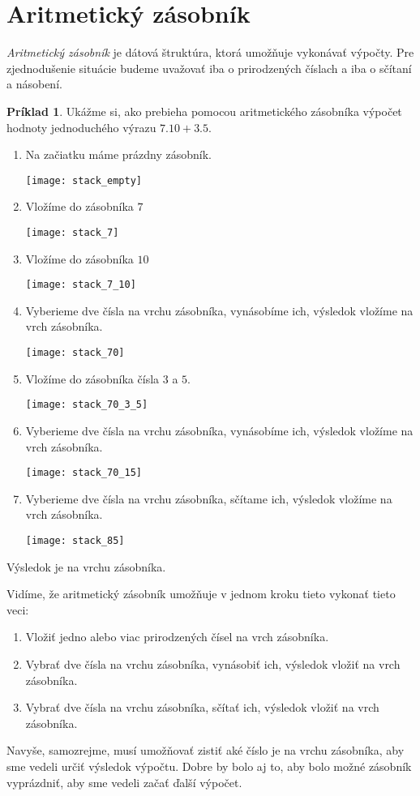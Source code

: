 \documentclass[11pt]{article}
\theoremstyle{definition}
\newtheorem{example}[theorem]{Príklad}
\begin{document}
\section{Aritmetický zásobník}
{\em Aritmetický zásobník} je dátová štruktúra, ktorá umožňuje vykonávať výpočty. Pre zjednodušenie
situácie budeme uvažovať iba o prirodzených číslach a iba o sčítaní a násobení.
\begin{example}
Ukážme si, ako prebieha pomocou aritmetického zásobníka výpočet hodnoty 
jednoduchého výrazu $7.10+3.5$.
\begin{enumerate}
\item Na začiatku máme prázdny zásobník.
\begin{center}
\texttt{[image: stack\_empty]}
\end{center}
\item Vložíme do zásobníka $7$
\begin{center}
\texttt{[image: stack\_7]}
\end{center}
\item Vložíme do zásobníka $10$
\begin{center}
\texttt{[image: stack\_7\_10]}
\end{center}
\item Vyberieme dve čísla na vrchu zásobníka, vynásobíme ich, výsledok vložíme na vrch zásobníka.
\begin{center}
\texttt{[image: stack\_70]}
\end{center}
\item Vložíme do zásobníka čísla $3$ a $5$.
\begin{center}
\texttt{[image: stack\_70\_3\_5]}
\end{center}
\item Vyberieme dve čísla na vrchu zásobníka, vynásobíme ich, výsledok vložíme na vrch zásobníka.
\begin{center}
\texttt{[image: stack\_70\_15]}
\end{center}
\item Vyberieme dve čísla na vrchu zásobníka, sčítame ich, výsledok vložíme na vrch zásobníka.
\begin{center}
\texttt{[image: stack\_85]}
\end{center}
\end{enumerate}
Výsledok je na vrchu zásobníka.
\end{example}
Vidíme, že aritmetický zásobník umožňuje v jednom kroku tieto vykonať tieto veci:
\begin{enumerate}
\item Vložiť jedno alebo viac prirodzených čísel na vrch zásobníka.
\item Vybrať dve čísla na vrchu zásobníka, vynásobiť ich, výsledok vložiť na vrch zásobníka.
\item Vybrať dve čísla na vrchu zásobníka, sčítať ich, výsledok vložiť na vrch zásobníka.
\end{enumerate}
Navyše, samozrejme, musí umožňovať zistiť aké číslo je na vrchu zásobníka, aby sme vedeli určiť výsledok výpočtu. Dobre
by bolo aj to, aby bolo možné zásobník vyprázdniť, aby sme vedeli začať ďalší výpočet.
\end{document}
